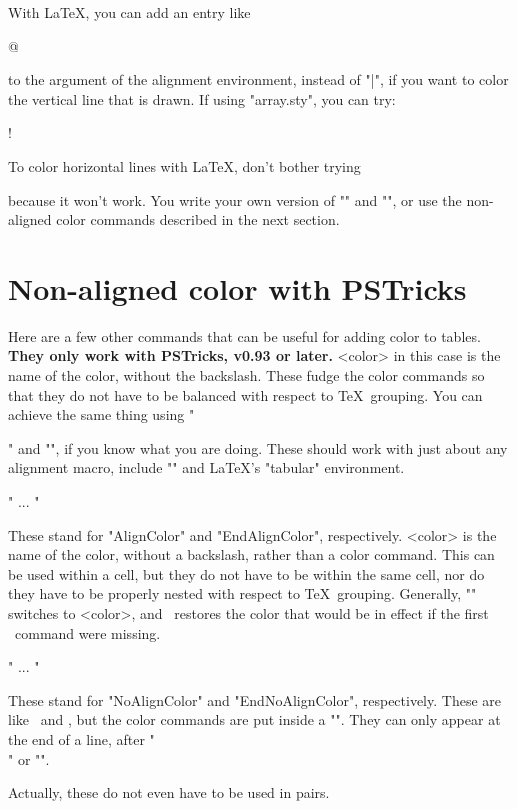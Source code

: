With \LaTeX, you can add an entry like
\begin{LVerbatim}
  @{\hspace{\tabcolsep}{\gray\vrule}\hspace{\tabcolsep}}
\end{LVerbatim}
to the argument of the alignment environment, instead of "|", if you want to
color the vertical line that is drawn. If using "array.sty", you can try:
\begin{LVerbatim}
  !{{\gray\vrule}}
\end{LVerbatim}

To color horizontal lines with \LaTeX, don't bother trying
\begin{LVerbatim}
  {\gray\hline}
\end{LVerbatim}
because it won't work. You write your own version of "\hline" and "\cline", or
use the non-aligned color commands described in the next section.

\section{Non-aligned color with PSTricks}

Here are a few other commands that can be useful for adding color to tables.
{\bf They only work with PSTricks, v0.93 or later.} <color> in this case is
the name of the color, without the backslash. These fudge the color commands
so that they do not have to be balanced with respect to \TeX\ grouping. You
can achieve the same thing using "" and "\noalign",
if you know what you are doing. These should work with just about any
alignment macro, include "\halign" and \LaTeX's "tabular" environment.

\begin{description}

\vitem" ... \EAC" \

  These stand for "AlignColor" and "EndAlignColor", respectively. <color> is
the name of the color, without a backslash, rather than a color command. This
can be used within a cell, but they do not have to be within the same cell,
nor do they have to be properly nested with respect to \TeX\ grouping.
Generally, "" switches to <color>, and \n\EAC\ restores the color
that would be in effect if the first \n\AC\ command were missing.

\vitem" ... \ENAC" \

  These stand for "NoAlignColor" and "EndNoAlignColor", respectively. These
are like \n\AC\ and \n\EAC, but the color commands are put inside a
"\noalign". They can only appear at the end of a line, after "\\" or "\cr".

\end{description}
Actually, these do not even have to be used in pairs.

